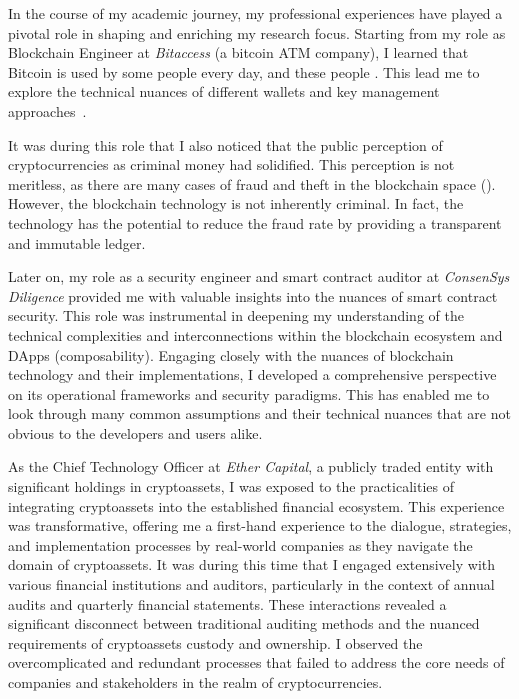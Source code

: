 
In the course of my academic journey, my professional experiences have played a pivotal role in shaping and enriching my research focus. Starting from my role as Blockchain Engineer at \textit{Bitaccess} (a bitcoin ATM company), I learned that Bitcoin is used by some people every day, and these people . This lead me to explore the technical nuances of different wallets and key management approaches~\cite{eskandari2015real,eskandari2016buy,EBSC15}.

It was during this role that I also noticed that the public perception of cryptocurrencies as criminal money had solidified. This perception is not meritless, as there are many cases of fraud and theft in the blockchain space (). However, the blockchain technology is not inherently criminal. In fact, the technology has the potential to reduce the fraud rate by providing a transparent and immutable ledger. 

 Later on, my role as a security engineer and smart contract auditor at \textit{ConsenSys Diligence} provided me with valuable insights into the nuances of smart contract security. This role was instrumental in deepening my understanding of the technical complexities and interconnections within the blockchain ecosystem and DApps (\ie composability). Engaging closely with the nuances of blockchain technology and their implementations, I developed a comprehensive perspective on its operational frameworks and security paradigms. This has enabled me to look through many common assumptions and their technical nuances that are not obvious to the developers and users alike. 

As the Chief Technology Officer at \textit{Ether Capital}, a publicly traded entity with significant holdings in cryptoassets, I was exposed to the practicalities of integrating cryptoassets into the established financial ecosystem. This experience was transformative, offering me a first-hand experience to the dialogue, strategies, and implementation processes by real-world companies as they navigate the domain of cryptoassets. It was during this time that I engaged extensively with various financial institutions and auditors, particularly in the context of annual audits and quarterly financial statements. These interactions revealed a significant disconnect between traditional auditing methods and the nuanced requirements of cryptoassets custody and ownership. I observed the overcomplicated and redundant processes that failed to address the core needs of companies and stakeholders in the realm of cryptocurrencies.

